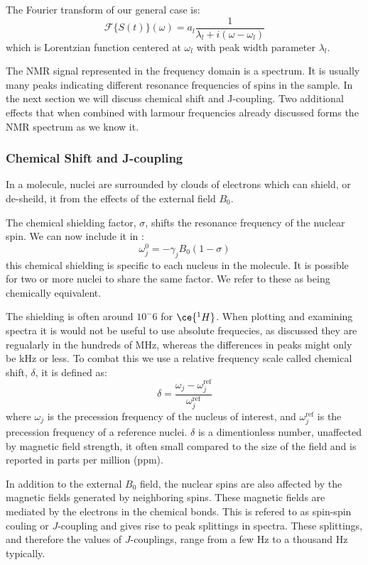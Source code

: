 The Fourier transform of our general case is:
\begin{equation}
  \mathcal{F}\{S(t)\}(\omega) = a_l\frac{1}{\lambda_l + i(\omega - \omega_l)}
\end{equation}
which is Lorentzian function centered at $\omega_l$ with peak width parameter $\lambda_l$.

The NMR signal represented in the frequency domain is a spectrum. It is usually many peaks
indicating different resonance frequencies of spins in the sample. In the next
section we will discuss chemical shift and J-coupling. Two additional effects that when combined
with larmour frequencies already discussed forms the NMR spectrum as we know it.

\subsubsection{Chemical Shift and J-coupling}

In a molecule, nuclei are surrounded by clouds of electrons which can shield, or de-sheild, it
from the effects of the external field $B_0$.

The chemical shielding factor, $\sigma$, shifts the resonance frequency of the nuclear spin. We
can now include it in :
\begin{equation}
  \omega_j^0 = -\gamma_jB_0(1-\sigma)
\end{equation}
this chemical shielding is specific to each nucleus in the molecule. It is possible
for two or more nuclei to share the same factor. We refer to these as being chemically equivalent.

The shielding is often around $10^-6$ for $\ce{^1H}$. When plotting and examining spectra
it is would not be useful to use absolute frequecies, as discussed they are regualarly in the hundreds of MHz,
whereas the differences in peaks might only be kHz or less. To combat this we use a relative frequency scale
called chemical shift, $\delta$, it is defined as:
\begin{equation}
  \delta = \frac{\omega_j-\omega^\text{ref}_j}{\omega^\text{ref}_j}
\end{equation}
where $\omega_j$ is the precession frequency of the nucleus of interest, and $\omega^\text{ref}_j$ is the precession
frequency of a reference nuclei. $\delta$ is a dimentionless number, unaffected by magnetic field strength, it often
small compared to the size of the field and is reported in parts per million (ppm).

In addition to the external $B_0$ field, the nuclear spins are also affected by the magnetic fields generated
by neighboring spins. These magnetic fields are mediated by the electrons in the chemical bonds. This is refered to as
spin-spin couling or $J$-coupling and gives rise to peak splittings in spectra. These splittings, and therefore the values of $J$-couplings, range from a few Hz to a thousand Hz typically.

